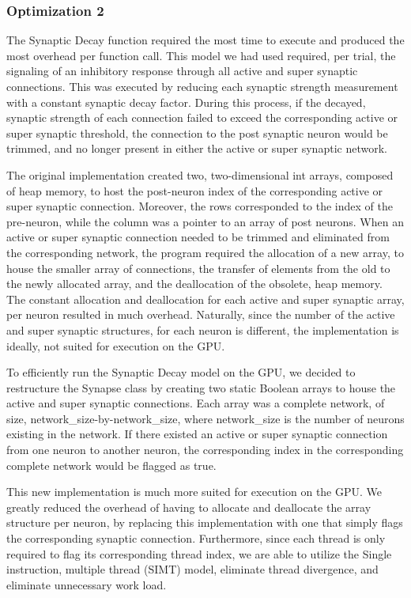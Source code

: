 \documentclass[a4paper]{article}
\begin{document}
\subsubsection{Optimization 2}
The Synaptic Decay function required the most time to execute and produced the most overhead per function call. This model we had used required, per trial, the signaling of an inhibitory response through all active and super synaptic connections. This was executed by reducing each synaptic strength measurement with a constant synaptic decay factor. During this process, if the decayed, synaptic strength of each connection failed to exceed the corresponding active or super synaptic threshold, the connection to the post synaptic neuron would be trimmed, and no longer present in either the active or super synaptic network.

The original implementation created two, two-dimensional int arrays, composed of heap memory, to host the post-neuron index of the corresponding active or super synaptic connection. Moreover, the rows corresponded to the index of the pre-neuron, while the column was a pointer to an array of post neurons. When an active or super synaptic connection needed to be trimmed and eliminated from the corresponding network, the program required the allocation of a new array, to house the smaller array of connections, the transfer of elements from the old to the newly allocated array, and the deallocation of the obsolete, heap memory. The constant allocation and deallocation for each active and super synaptic array, per neuron resulted in much overhead. Naturally, since the number of the active and super synaptic structures, for each neuron is different, the implementation is ideally, not suited for execution on the GPU.

To efficiently run the Synaptic Decay model on the GPU, we decided to restructure the Synapse class by creating two static Boolean arrays to house the active and super synaptic connections. Each array was a complete network, of size, network\_size-by-network\_size, where network\_size is the number of neurons existing in the network. If there existed an active or super synaptic connection from one neuron to another neuron, the corresponding index in the corresponding complete network would be flagged as true.

This new implementation is much more suited for execution on the GPU. We greatly reduced the overhead of having to allocate and deallocate the array structure per neuron, by replacing this implementation with one that simply flags the corresponding synaptic connection.  Furthermore, since each thread is only required to flag its corresponding thread index, we are able to utilize the Single instruction, multiple thread (SIMT) model, eliminate thread divergence, and eliminate unnecessary work load.
\end{document}
